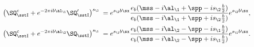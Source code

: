 \begin{equation}\begin{aligned}
\big(\SQ_{\rm\sst I}^c{}+e^{-2\pi i b\al_\1}\SQ_{\rm\sst I}'{}\big)^{s_\2}\;=\;&
e^{s_\2b\sx}\frac{e_b(\mss-i\al_\1+\spp-is_\2\frac{b}{2})}
{e_b(\mss-i\al_\1+\spp+is_\2\frac{b}{2})}e^{s_\2b\sx},\\
\big(\SQ_{\rm\sst I}^c{}+e^{-2\pi i b\al_\2}\SQ_{\rm\sst I}\big)^{s_\1}\;=\;&
e^{s_\1b\sx}\frac{e_b(\mss-i\al_\2-\spp-is_\1\frac{b}{2})}
{e_b(\mss-i\al_\2-\spp+is_\1\frac{b}{2})}e^{s_\1b\sx}.
\end{aligned}\end{equation}

